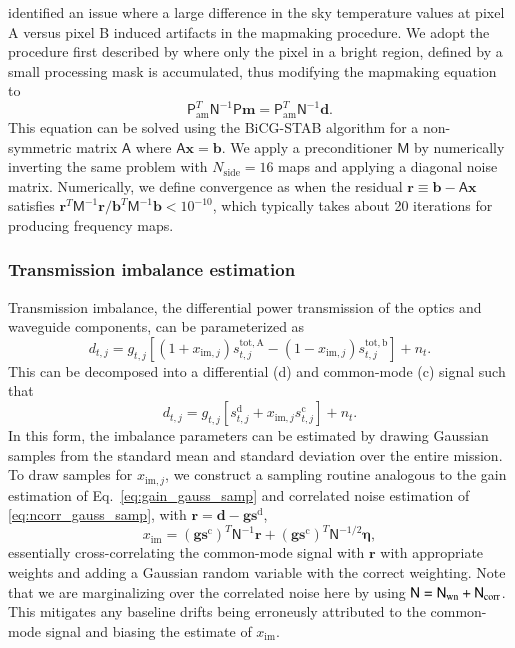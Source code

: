 \documentclass[twocolumn]{../../common/aa}
\newcommand{\N}[0]{\tens{N}}
\begin{document}
\citet{jarosik2010} identified an issue where a large difference in the sky temperature values at pixel A versus pixel B induced artifacts in the mapmaking procedure. We adopt the procedure first described by \citet{hinshaw2003a} where only the pixel in a bright region, defined by a small processing mask \citep{bennett2012} is accumulated, thus modifying the mapmaking equation to
\begin{equation}
	\mathsf P^T_\mathrm{am}\mathsf N^{-1}\mathsf P\boldsymbol m
	=\mathsf P^T_\mathrm{am}\mathsf N^{-1}\boldsymbol d.
\end{equation}
This equation can be solved using the BiCG-STAB algorithm for a non-symmetric matrix $\mathsf A$ where $\mathsf A\boldsymbol x=\boldsymbol b$. We apply a preconditioner $\mathsf M$ by numerically inverting the same problem with $N_\mathrm{side}=16$ maps and applying a diagonal noise matrix. Numerically, we define convergence as when the residual $\boldsymbol r\equiv\boldsymbol b-\mathsf A\boldsymbol x$ satisfies $\boldsymbol r^T\mathsf M^{-1}\boldsymbol r/\boldsymbol b^T\mathsf M^{-1}\boldsymbol b<10^{-10}$, which typically takes about 20 iterations for producing frequency maps.


\subsubsection{Transmission imbalance estimation}
\label{ssec:imbalance}


Transmission imbalance, the differential power transmission of the optics and waveguide components, can be parameterized as
\begin{equation}
	d_{t,j}=g_{t,j}[(1+x_{\mathrm{im},j})s_{t,j}^\mathrm{tot,A}-(1-x_{\mathrm{im},j})s_{t,j}^\mathrm{tot,b}]+n_t.
\end{equation}
This can be decomposed into a differential (d) and common-mode (c) signal such that
\begin{equation}
	d_{t,j}=g_{t,j}[s_{t,j}^\mathrm d+x_{\mathrm{im},j}s_{t,j}^\mathrm c]+n_t.
\end{equation}
In this form, the imbalance parameters can be estimated by drawing Gaussian samples from the standard mean and standard deviation over the entire mission. To draw samples for $x_{\mathrm{im},j}$, we construct a sampling routine analogous to the gain estimation of Eq.~\eqref{eq:gain_gauss_samp} and correlated noise estimation of  \eqref{eq:ncorr_gauss_samp}, with $\boldsymbol r=\boldsymbol d-\boldsymbol g\boldsymbol s^\mathrm d$,
\begin{equation}
	[(\boldsymbol g\boldsymbol s^\mathrm c)^T\mathsf N^{-1}\boldsymbol g\boldsymbol s^\mathrm c]x_\mathrm{im}
	=(\boldsymbol g\boldsymbol s^\mathrm c)^T\mathsf N^{-1}\boldsymbol r+(\boldsymbol g\boldsymbol s^\mathrm c)^T\mathsf N^{-1/2}\boldsymbol\eta,
\end{equation}
essentially cross-correlating the common-mode signal with $\boldsymbol r$ with appropriate weights and adding a Gaussian random variable with the correct weighting. Note that we are marginalizing over the correlated noise here by using $\N=\N_\mathrm{wn}+\N_\mathrm{corr}$. This mitigates any baseline drifts being erroneusly attributed to the common-mode signal and biasing the estimate of $x_\mathrm{im}$.
\end{document}
